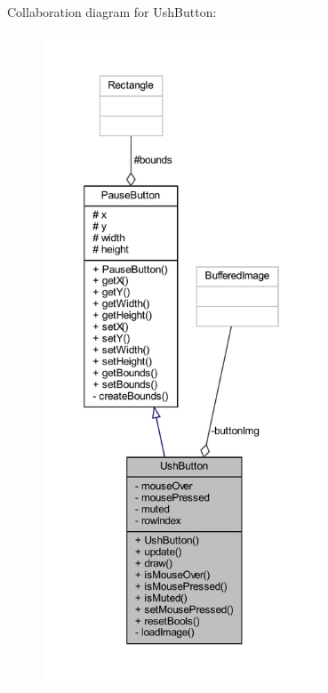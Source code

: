 Collaboration diagram for Ush\+Button\+:\nopagebreak
\begin{figure}[H]
\begin{center}
\leavevmode
\includegraphics[height=550pt]{classui_1_1_ush_button__coll__graph}
\end{center}
\end{figure}
